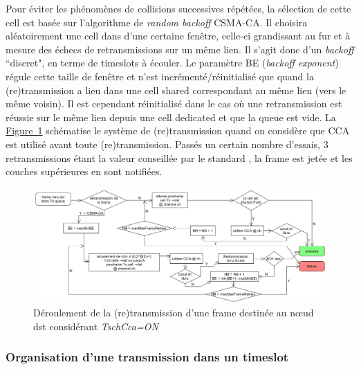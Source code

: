 \documentclass[]{report}
\newcommand{\wordlink}[2]{\hyperref[#2]{#1~\ref{#2}}}
\begin{document}
\par Pour éviter les phénomènes de collisions successives répétées, la sélection de cette cell est basée sur l'algorithme de \textit{random backoff} CSMA-CA. Il choisira aléatoirement une cell dans d'une certaine fenêtre, celle-ci grandissant au fur et à mesure des échecs de retransmissions sur un même lien. Il s'agit donc d'un \textit{backoff} ``discret", en terme de timeslots à écouler. Le paramètre BE (\textit{backoff exponent}) régule cette taille de fenêtre et n'est incrémenté/réinitialisé que quand la (re)transmission a lieu dans une cell shared correspondant au même lien (vers le même voisin). Il est cependant réinitialisé dans le cas où une retransmission est réussie sur le même lien depuis une cell dedicated et que la queue est vide. La \wordlink{Figure}{fig:CSMA} schématise le système de (re)transmission quand on considère que CCA est utilisé avant toute (re)transmission. Passés un certain nombre d'essais, 3 retransmissions étant la valeur conseillée par le standard \cite{IEEE802.15.4}, la frame est jetée et les couches supérieures en sont notifiées.

	\begin{figure}[!ht]
	\centering
	\includegraphics[width=0.9\linewidth]{CSMA-CA}
	\caption{Déroulement de la (re)transmission d'une frame destinée au nœud dst considérant \textit{TschCca=ON}}
	\label{fig:CSMA}
	\end{figure}


\subsubsection{Organisation d'une transmission dans un timeslot}
\label{templatetimeslot}
\end{document}
